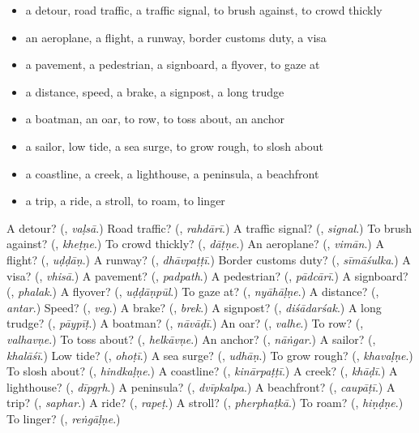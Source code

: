 \begin{itemize}
\raggedright
  \item a detour, road traffic, a traffic signal, to brush against, to crowd thickly
  \item an aeroplane, a flight, a runway, border customs duty, a visa
  \item a pavement, a pedestrian, a signboard, a flyover, to gaze at
  \item a distance, speed, a brake, a signpost, a long trudge
  \item a boatman, an oar, to row, to toss about, an anchor
  \item a sailor, low tide, a sea surge, to grow rough, to slosh about
  \item a coastline, a creek, a lighthouse, a peninsula, a beachfront
  \item a trip, a ride, a stroll, to roam, to linger
\end{itemize}

\begin{tcolorbox}[breakable,colback=teal!4,colframe=teal!35!black,title={Before you move on}]
A detour? (\textbf{}, \emph{vaḷsā}.) Road traffic? (\textbf{}, \emph{rahdārī}.) A traffic signal? (\textbf{}, \emph{signal}.) To brush against? (\textbf{}, \emph{kheṭṇe}.) To crowd thickly? (\textbf{}, \emph{dāṭṇe}.) An aeroplane? (\textbf{}, \emph{vimān}.) A flight? (\textbf{}, \emph{uḍḍāṇ}.) A runway? (\textbf{}, \emph{dhāvpaṭṭī}.) Border customs duty? (\textbf{}, \emph{sīmāśulka}.) A visa? (\textbf{}, \emph{vhisā}.) A pavement? (\textbf{}, \emph{padpath}.) A pedestrian? (\textbf{}, \emph{pādcārī}.) A signboard? (\textbf{}, \emph{phalak}.) A flyover? (\textbf{}, \emph{uḍḍāṇpūl}.) To gaze at? (\textbf{}, \emph{nyāhāḷṇe}.) A distance? (\textbf{}, \emph{antar}.) Speed? (\textbf{}, \emph{veg}.) A brake? (\textbf{}, \emph{brek}.) A signpost? (\textbf{}, \emph{diśādarśak}.) A long trudge? (\textbf{}, \emph{pāypīṭ}.) A boatman? (\textbf{}, \emph{nāvāḍī}.) An oar? (\textbf{}, \emph{valhe}.) To row? (\textbf{}, \emph{valhavṇe}.) To toss about? (\textbf{}, \emph{helkāvṇe}.) An anchor? (\textbf{}, \emph{nāṅgar}.) A sailor? (\textbf{}, \emph{khalāśī}.) Low tide? (\textbf{}, \emph{ohoṭī}.) A sea surge? (\textbf{}, \emph{udhāṇ}.) To grow rough? (\textbf{}, \emph{khavaḷṇe}.) To slosh about? (\textbf{}, \emph{hindkaḷṇe}.) A coastline? (\textbf{}, \emph{kinārpaṭṭī}.) A creek? (\textbf{}, \emph{khāḍī}.) A lighthouse? (\textbf{}, \emph{dīpgṛh}.) A peninsula? (\textbf{}, \emph{dvīpkalpa}.) A beachfront? (\textbf{}, \emph{caupāṭī}.) A trip? (\textbf{}, \emph{saphar}.) A ride? (\textbf{}, \emph{rapeṭ}.) A stroll? (\textbf{}, \emph{pherphaṭkā}.) To roam? (\textbf{}, \emph{hiṇḍṇe}.) To linger? (\textbf{}, \emph{reṅgāḷṇe}.)
\end{tcolorbox}
